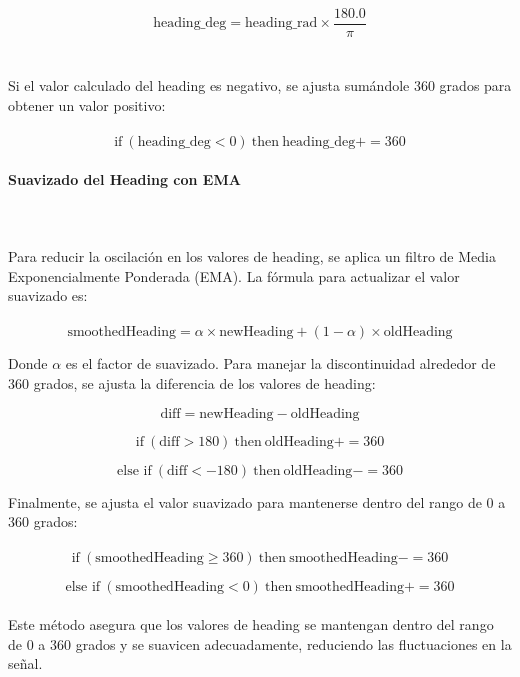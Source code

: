 \[
\text{heading\_deg} = \text{heading\_rad} \times \frac{180.0}{\pi}
\]
\\ \\
Si el valor calculado del heading es negativo, se ajusta sumándole 360 grados para obtener un valor positivo:
\\ \\
\[
\text{if} \ (\text{heading\_deg} < 0) \ \text{then} \ \text{heading\_deg} += 360
\]

\paragraph{\large Suavizado del Heading con EMA}
\\ \\
Para reducir la oscilación en los valores de heading, se aplica un filtro de Media Exponencialmente Ponderada (EMA). La fórmula para actualizar el valor suavizado es:
\\ \\
\[
\text{smoothedHeading} = \alpha \times \text{newHeading} + (1 - \alpha) \times \text{oldHeading}
\]

Donde \(\alpha\) es el factor de suavizado. Para manejar la discontinuidad alrededor de 360 grados, se ajusta la diferencia de los valores de heading:

\[
\text{diff} = \text{newHeading} - \text{oldHeading}
\]

\[
\text{if} \ (\text{diff} > 180) \ \text{then} \ \text{oldHeading} += 360
\]

\[
\text{else if} \ (\text{diff} < -180) \ \text{then} \ \text{oldHeading} -= 360
\]

Finalmente, se ajusta el valor suavizado para mantenerse dentro del rango de 0 a 360 grados:
\\ \\
\[
\text{if} \ (\text{smoothedHeading} \geq 360) \ \text{then} \ \text{smoothedHeading} -= 360
\]

\[
\text{else if} \ (\text{smoothedHeading} < 0) \ \text{then} \ \text{smoothedHeading} += 360
\]
\\ 
Este método asegura que los valores de heading se mantengan dentro del rango de 0 a 360 grados y se suavicen adecuadamente, reduciendo las fluctuaciones en la señal.
\\ \\
